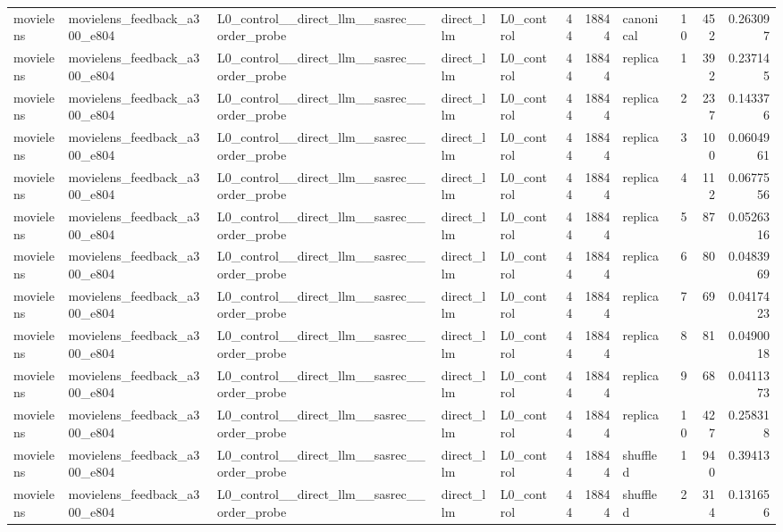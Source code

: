 \begin{table}[htbp!]
\begin{tabular}{lllllrrlrrr}
movielens & movielens\_feedback\_a300\_e804 & L0\_control\_\_direct\_llm\_\_sasrec\_\_order\_probe & direct\_llm & L0\_control & 44 & 18844 & canonical & 10 & 452 & 0.263097 \\
movielens & movielens\_feedback\_a300\_e804 & L0\_control\_\_direct\_llm\_\_sasrec\_\_order\_probe & direct\_llm & L0\_control & 44 & 18844 & replica & 1 & 392 & 0.237145 \\
movielens & movielens\_feedback\_a300\_e804 & L0\_control\_\_direct\_llm\_\_sasrec\_\_order\_probe & direct\_llm & L0\_control & 44 & 18844 & replica & 2 & 237 & 0.143376 \\
movielens & movielens\_feedback\_a300\_e804 & L0\_control\_\_direct\_llm\_\_sasrec\_\_order\_probe & direct\_llm & L0\_control & 44 & 18844 & replica & 3 & 100 & 0.0604961 \\
movielens & movielens\_feedback\_a300\_e804 & L0\_control\_\_direct\_llm\_\_sasrec\_\_order\_probe & direct\_llm & L0\_control & 44 & 18844 & replica & 4 & 112 & 0.0677556 \\
movielens & movielens\_feedback\_a300\_e804 & L0\_control\_\_direct\_llm\_\_sasrec\_\_order\_probe & direct\_llm & L0\_control & 44 & 18844 & replica & 5 & 87 & 0.0526316 \\
movielens & movielens\_feedback\_a300\_e804 & L0\_control\_\_direct\_llm\_\_sasrec\_\_order\_probe & direct\_llm & L0\_control & 44 & 18844 & replica & 6 & 80 & 0.0483969 \\
movielens & movielens\_feedback\_a300\_e804 & L0\_control\_\_direct\_llm\_\_sasrec\_\_order\_probe & direct\_llm & L0\_control & 44 & 18844 & replica & 7 & 69 & 0.0417423 \\
movielens & movielens\_feedback\_a300\_e804 & L0\_control\_\_direct\_llm\_\_sasrec\_\_order\_probe & direct\_llm & L0\_control & 44 & 18844 & replica & 8 & 81 & 0.0490018 \\
movielens & movielens\_feedback\_a300\_e804 & L0\_control\_\_direct\_llm\_\_sasrec\_\_order\_probe & direct\_llm & L0\_control & 44 & 18844 & replica & 9 & 68 & 0.0411373 \\
movielens & movielens\_feedback\_a300\_e804 & L0\_control\_\_direct\_llm\_\_sasrec\_\_order\_probe & direct\_llm & L0\_control & 44 & 18844 & replica & 10 & 427 & 0.258318 \\
movielens & movielens\_feedback\_a300\_e804 & L0\_control\_\_direct\_llm\_\_sasrec\_\_order\_probe & direct\_llm & L0\_control & 44 & 18844 & shuffled & 1 & 940 & 0.39413 \\
movielens & movielens\_feedback\_a300\_e804 & L0\_control\_\_direct\_llm\_\_sasrec\_\_order\_probe & direct\_llm & L0\_control & 44 & 18844 & shuffled & 2 & 314 & 0.131656 \\

\end{tabular}
\end{table}
